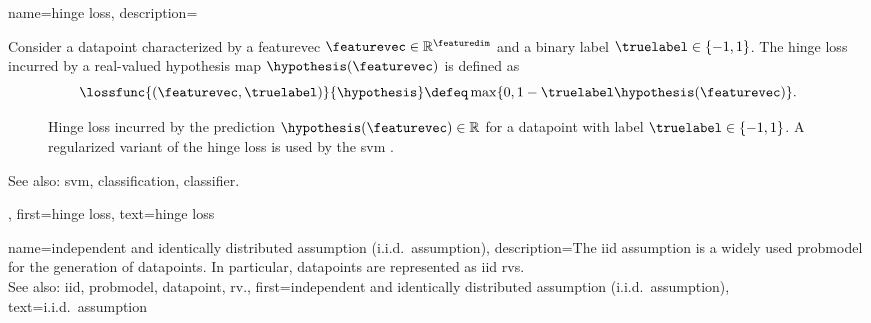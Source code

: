 {name={hinge loss}, 
	description={Consider a \gls{datapoint} 
		characterized by a \gls{featurevec} $\featurevec \in \mathbb{R}^{\featuredim}$ and a 
		binary \gls{label} $\truelabel \in \{-1,1\}$. The hinge \gls{loss} incurred by a real-valued 
		\gls{hypothesis} \gls{map} $\hypothesis(\featurevec)$ is defined as 
		\begin{equation} 
			\label{equ_hinge_loss_gls_dict}
			\lossfunc{(\featurevec,\truelabel)}{\hypothesis} \defeq \max \{ 0 , 1 - \truelabel \hypothesis(\featurevec) \}. 
		\end{equation}
		\begin{figure}[H]
		\begin{center}
		\caption{Hinge \gls{loss} incurred by the \gls{prediction} $\hypothesis(\featurevec) \in \mathbb{R}$ 
			for a \gls{datapoint} with \gls{label} $\truelabel \in \{-1,1\}$. A regularized variant of the hinge 
			\gls{loss} is used by the \gls{svm} \cite{LampertNowKernel}.}
			\label{fig_hingeloss_dict}
		\end{center}
		\end{figure} 	    
		See also: \gls{svm}, \gls{classification}, \gls{classifier}.},
	first={hinge loss},
	text={hinge loss}
}

{name={independent and identically distributed assumption (i.i.d.\ assumption)}, 
	description={The \gls{iid} assumption 
		is a widely used \gls{probmodel} for the generation of \glspl{datapoint}. 
		In particular, \glspl{datapoint} are represented as \gls{iid} \glspl{rv}.
				\\
		See also: \gls{iid}, \gls{probmodel}, \gls{datapoint}, \gls{rv}.},
	first={independent and identically distributed assumption (i.i.d.\ assumption)},
	text={i.i.d.\ assumption} 
}

